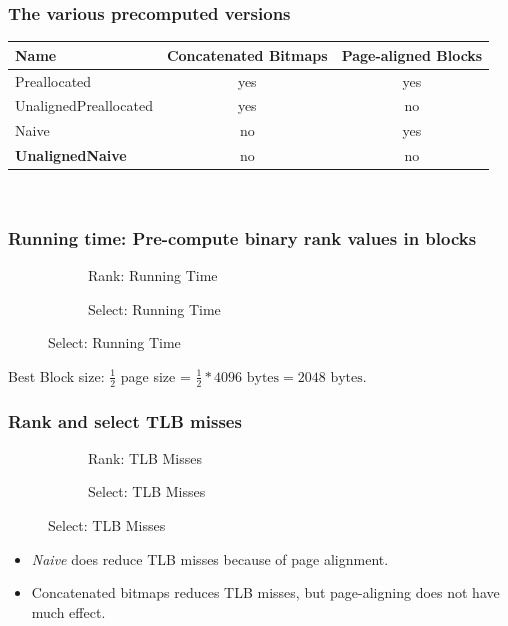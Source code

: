 \documentclass{beamer}
\begin{document}
\begin{frame}
\frametitle{The various precomputed versions}
\begin{tabular}{|lcc|}
\hline
Name						& Concatenated Bitmaps	& Page-aligned Blocks	\\ \hline
Preallocated				& yes					& yes					\\ \hline
UnalignedPreallocated	& yes					& no						\\ \hline
Naive					& no						& yes					\\ \hline
\textbf{UnalignedNaive}			& no						& no						\\ \hline
\end{tabular}\\
\end{frame}

\begin{frame}
\frametitle{Running time: Pre-compute binary rank values in blocks}
\begin{figure}
\begin{subfigure}{0.45\textwidth}
	\begin{tiny}	
	\scalebox{.7}{}
	\end{tiny}
	\caption{Rank: Running Time}
\end{subfigure}
\hfill
\begin{subfigure}{0.45\textwidth}
	\begin{tiny}	
	\scalebox{.7}{}
	\end{tiny}
	\caption{Select: Running Time}
\end{subfigure}
\end{figure}
Best Block size: $\frac{1}{2}$ page size = $\frac{1}{2}*4096 \text{ bytes} = 2048 \text{ bytes}$.
\end{frame}

\begin{frame}
\frametitle{Rank and select TLB misses}
\begin{figure}\tiny
\begin{subfigure}{0.48\textwidth}
	\scalebox{.7}{}
	\caption{Rank: TLB Misses}
\end{subfigure}
\hfill
\begin{subfigure}{0.48\textwidth}
	\scalebox{.7}{}
	\caption{Select: TLB Misses}
\end{subfigure}
\end{figure}
\begin{itemize}
\item \textit{Naive} does reduce TLB misses because of page alignment.
\item Concatenated bitmaps reduces TLB misses, but page-aligning does not have much effect.
\end{itemize}
\end{frame}
\end{document}
